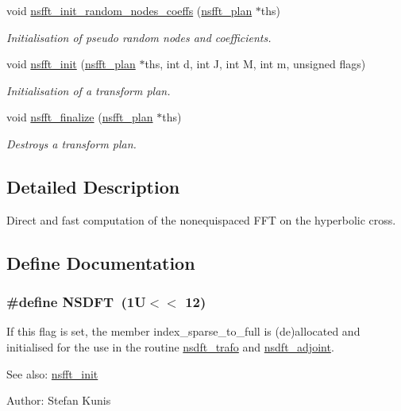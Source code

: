 \begin{CompactItemize}
void \hyperlink{group__nsfft_ga5}{nsfft\_\-init\_\-random\_\-nodes\_\-coeffs} (\hyperlink{structnsfft__plan}{nsfft\_\-plan} $\ast$ths)
\begin{CompactList}\small\item\em Initialisation of pseudo random nodes and coefficients. \item\end{CompactList}\item 
void \hyperlink{group__nsfft_ga6}{nsfft\_\-init} (\hyperlink{structnsfft__plan}{nsfft\_\-plan} $\ast$ths, int d, int J, int M, int m, unsigned flags)
\begin{CompactList}\small\item\em Initialisation of a transform plan. \item\end{CompactList}\item 
void \hyperlink{group__nsfft_ga7}{nsfft\_\-finalize} (\hyperlink{structnsfft__plan}{nsfft\_\-plan} $\ast$ths)
\begin{CompactList}\small\item\em Destroys a transform plan. \item\end{CompactList}\end{CompactItemize}


\subsection{Detailed Description}
Direct and fast computation of the nonequispaced FFT on the hyperbolic cross. 



\subsection{Define Documentation}
\hypertarget{group__nsfft_ga8}{
\subsubsection[NSDFT]{\setlength{\rightskip}{0pt plus 5cm}\#define NSDFT~(1U$<$$<$ 12)}}
\label{group__nsfft_ga8}


If this flag is set, the member index\_\-sparse\_\-to\_\-full is (de)allocated and initialised for the use in the routine \hyperlink{group__nsfft_ga0}{nsdft\_\-trafo} and \hyperlink{group__nsfft_ga1}{nsdft\_\-adjoint}. 

\begin{Desc}
\item[See also:]\hyperlink{group__nsfft_ga6}{nsfft\_\-init} \end{Desc}
\begin{Desc}
\item[Author:]Stefan Kunis \end{Desc}


